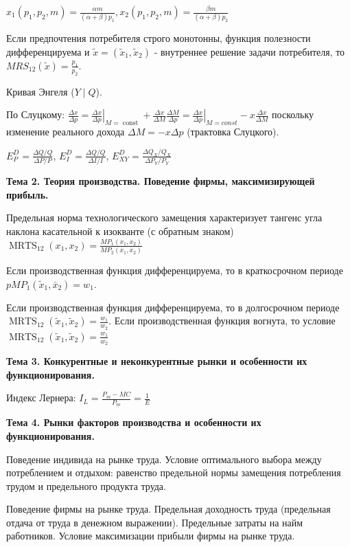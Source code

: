 \documentclass[a4paper,8pt]{article} %
\begin{document}
$x_{1}\left(p_{1}, p_{2}, m\right)=\frac{\alpha m}{(\alpha+\beta) p_{1}}, x_{2}\left(p_{1}, p_{2}, m\right)=\frac{\beta m}{(\alpha+\beta) p_{2}}$

Если предпочтения потребителя строго монотонны, функция полезности дифференцируема и $\tilde{x}=\left(\tilde{x}_{1}, \tilde{x}_{2}\right)$ - внутреннее решение задачи потребителя, то $M R S_{12}(\tilde{x})=\frac{p_{1}}{p_{2}} .$


Кривая Энгеля ($Y\mid Q$).

По Слуцкому: 
$\frac{\Delta x}{\Delta p}=\left.\frac{\Delta x}{\Delta p}\right|_{M=\text { const }}+\frac{\Delta x}{\Delta M} \frac{\Delta M}{\Delta p}=\left.\frac{\Delta x}{\Delta p}\right|_{M=c o n s t}-x \frac{\Delta x}{\Delta M}$
поскольку изменение реального дохода $\Delta M=-x \Delta p$ (трактовка Слуцкого).

$E_{P}^{D}=\frac{\Delta Q / Q}{\Delta P / P}$,
$E_{I}^{D}=\frac{\Delta Q / Q}{\Delta I / I}$, $E_{X Y}^{D}=\frac{\Delta Q_{X} / Q_{X}}{\Delta P_{Y} / P_{Y}}$


\textbf{Тема 2. Теория производства. Поведение фирмы, максимизирующей
прибыль.}

Предельная норма технологического замещения характеризует
тангенс угла наклона касательной к изокванте (с обратным знаком)
$\operatorname{MRTS}_{12}\left(x_{1}, x_{2}\right)=\frac{M P_{1}\left(x_{1}, x_{2}\right)}{M P_{2}\left(x_{1}, x_{2}\right)}$

Если производственная функция дифференцируема, то в краткосрочном периоде $p M P_{1}\left(\tilde{x}_{1}, \bar{x}_{2}\right)=w_{1} .$ 

Если производственная функция дифференцируема, то в долгосрочном периоде
$\operatorname{MRTS}_{12}\left(\tilde{x}_{1}, \tilde{x}_{2}\right)=\frac{w_{1}}{w_{2}} .$ Если производственная функция вогнута, то условие $\operatorname{MRTS}_{12}\left(\tilde{x}_{1}, \tilde{x}_{2}\right)=\frac{w_{1}}{w_{2}}$


\textbf{Тема 3. Конкурентные и неконкурентные рынки и особенности их
функционирования.}

Индекс Лернера: $I_{L}=\frac{P_{m}-M C}{P_{m}}=\frac{1}{E}$


\textbf{Тема 4. Рынки факторов производства и особенности их функционирования.}

Поведение индивида на рынке труда. 
Условие оптимального выбора между потреблением и отдыхом: равенство предельной нормы замещения потребления трудом и предельного продукта труда. 

Поведение фирмы на рынке труда. Предельная доходность труда (предельная отдача от труда в денежном выражении). Предельные затраты на найм
работников. Условие максимизации прибыли фирмы на рынке труда.
\end{document}
